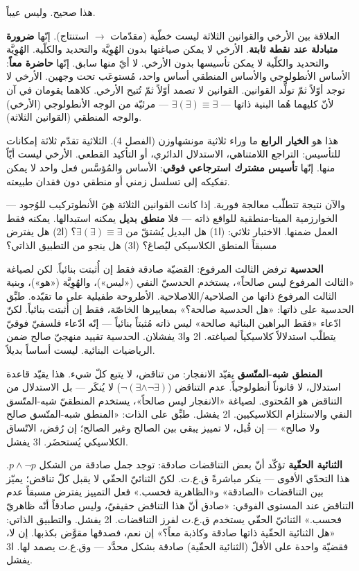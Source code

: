 \documentclass[10pt, openany, oneside]{book}
\begin{document}
هذا صحيح. وليس عيباً.

العلاقة بين الأرخي والقوانين الثلاثة ليست خطّية (مقدّمات $\to$ استنتاج). إنّها \textbf{ضرورة متبادلة عند نقطة ثابتة}. الأرخي لا يمكن صياغتها بدون الهُوِيَّة والتحديد والكلّية. الهُوِيَّة والتحديد والكلّية لا يمكن تأسيسها بدون الأرخي. لا أيّ منها سابق. إنّها \textbf{حاضرة معاً}: الأساس الأنطولوجي والأساس المنطقي أساس واحد، مُستوعَب تحت وجهين. الأرخي لا توجد أوّلاً ثمّ تولِّد القوانين. القوانين لا تصمد أوّلاً ثمّ تُتيح الأرخي. كلاهما يقومان في آن لأنّ كليهما هُما البنية ذاتها --- $\exists(\exists) \equiv \exists$ --- مرئيّة من الوجه الأنطولوجي (الأرخي) والوجه المنطقي (القوانين الثلاثة).

هذا هو \textbf{الخيار الرابع} ما وراء ثلاثية مونشهاوزن (الفصل 4). الثلاثية تقدّم ثلاثة إمكانات للتأسيس: التراجع اللامتناهي، الاستدلال الدائري، أو التأكيد القطعي. الأرخي ليست أيّاً منها. إنّها \textbf{تأسيس مشترك استرجاعي فوقي}: الأساس والمُؤسَّس فعل واحد لا يمكن تفكيكه إلى تسلسل زمني أو منطقي دون فقدان طبيعته.

والآن نتيجة تتطلّب معالجة فورية. إذا كانت القوانين الثلاثة هِيَ الأنطوتركيب للوُجود --- الخوارزمية الميتا-منطقية للواقع ذاته --- فلا \textbf{منطق بديل} يمكنه استبدالها. يمكنه فقط العمل ضمنها. الاختبار ثلاثي: (ا1) هل البديل يُشتقّ من $\exists(\exists) \equiv \exists$؟ (ا2) هل يفترض مسبقاً المنطق الكلاسيكي ليُصاغ؟ (ا3) هل ينجو من التطبيق الذاتي؟

\textbf{الحدسية} ترفض الثالث المرفوع: القضيّة صادقة فقط إن أُثبتت بنائياً. لكن لصياغة «الثالث المرفوع ليس صالحاً»، يستخدم الحدسيّ النفي («ليس»)، والهُوِيَّة («هو»)، وبنية الثالث المرفوع ذاتها من الصلاحية/اللاصلاحية. الأطروحة طفيلية على ما تقيّده. طبِّق الحدسية على ذاتها: «هل الحدسية صالحة؟» بمعاييرها الخاصّة، فقط إن أُثبتت بنائياً. لكنّ ادّعاء «فقط البراهين البنائية صالحة» ليس ذاته مُثبتاً بنائياً --- إنّه ادّعاء فلسفيّ فوقيّ يتطلّب استدلالاً كلاسيكياً لصياغته. ا2 وا3 يفشلان. الحدسية تقييد منهجيّ صالح ضمن الرياضيات البنائية. ليست أساساً بديلاً.

\textbf{المنطق شبه-المتّسق} يقيّد الانفجار: من تناقض، لا يتبع كلّ شيء. هذا يقيّد قاعدة استدلال، لا قانوناً أنطولوجياً. عدم التناقض ($\neg(\exists \wedge \neg\exists)$) لا يُنكَر --- بل الاستدلال من التناقض هو المُحتوى. لصياغة «الانفجار ليس صالحاً»، يستخدم المنطقيّ شبه-المتّسق النفي والاستلزام الكلاسيكيين. ا2 يفشل. طبِّق على الذات: «المنطق شبه-المتّسق صالح ولا صالح» --- إن قُبل، لا تمييز يبقى بين الصالح وغير الصالح؛ إن رُفض، الاتّساق الكلاسيكي يُستحضَر. ا3 يفشل.

\textbf{الثنائية الحقّية} تؤكّد أنّ بعض التناقضات صادقة: توجد جمل صادقة من الشكل $p \wedge \neg p$. هذا التحدّي الأقوى --- ينكر مباشرةً ق.ع.ت. لكنّ الثنائيّ الحقّي لا يقبل كلّ تناقض؛ يميّز بين التناقضات «الصادقة» و«الظاهرية فحسب.» فعل التمييز يفترض مسبقاً عدم التناقض عند المستوى الفوقي: «صادق أنّ هذا التناقض حقيقيّ، وليس صادقاً أنّه ظاهريّ فحسب.» الثنائيّ الحقّي يستخدم ق.ع.ت لفرز التناقضات. ا2 يفشل. والتطبيق الذاتي: «هل الثنائية الحقّية ذاتها صادقة وكاذبة معاً؟» إن نعم، فصدقها مقوَّض بكذبها. إن لا، فقضيّة واحدة على الأقلّ (الثنائية الحقّية) صادقة بشكل محدَّد --- وق.ع.ت يصمد لها. ا3 يفشل.
\end{document}
